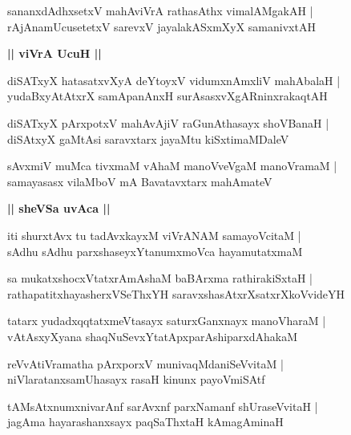 \documentclass[twoside,12pt,openright]{book}
\newcounter{shloka}[chapter]
\def\uvaca#1{\centerline{{\large\textbf{#1}}}}
\begin{document}
\begin{shloka}%
sananxdAdhxsetxV mahAviVrA rathasAthx vimalAMgakAH |\\
rAjAnamUcusetetxV sarevxV jayalakASxmXyX samanivxtAH 
\end{shloka}

\uvaca{|| viVrA UcuH ||}

\begin{shloka}%
diSATxyX hatasatxvXyA deYtoyxV vidumxnAmxliV mahAbalaH |\\
yudaBxyAtAtxrX samApanAnxH surAsasxvXgARninxrakaqtAH 
\end{shloka}

\begin{shloka}%
diSATxyX pArxpotxV mahAvAjiV raGunAthasayx shoVBanaH |\\
diSAtxyX gaMtAsi saravxtarx jayaMtu kiSxtimaMDaleV 
\end{shloka}

\begin{shloka}%
sAvxmiV muMca tivxmaM vAhaM manoVveVgaM manoVramaM |\\
samayasasx vilaMboV mA Bavatavxtarx mahAmateV 
\end{shloka}

\uvaca{|| sheVSa uvAca ||}

\begin{shloka}%
iti shurxtAvx tu tadAvxkayxM viVrANAM samayoVcitaM |\\
sAdhu sAdhu parxshaseyxYtanumxmoVca hayamutatxmaM 
\end{shloka}

\begin{shloka}%
sa mukatxshocxVtatxrAmAshaM baBArxma rathirakiSxtaH |\\
rathapatitxhayasherxVSeThxYH saravxshasAtxrXsatxrXkoVvideYH 
\end{shloka}

\begin{shloka}%
tatarx yudadxqqtatxmeVtasayx saturxGanxnayx manoVharaM |\\
vAtAsxyXyana shaqNuSevxYtatApxparAshiparxdAhakaM 
\end{shloka}

\begin{shloka}%
reVvAtiVramatha pArxporxV munivaqMdaniSeVvitaM |\\
niVlaratanxsamUhasayx rasaH kinunx payoVmiSAtf 
\end{shloka}

\begin{shloka}%
tAMsAtxnumxnivarAnf sarAvxnf parxNamanf shUraseVvitaH |\\
jagAma hayarashanxsayx paqSaThxtaH kAmagAminaH 
\end{shloka}
\end{document}
